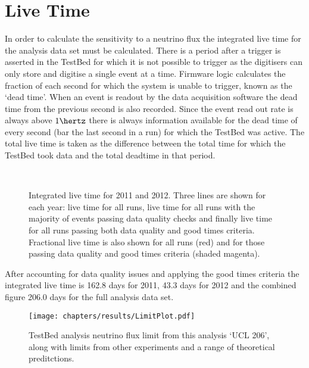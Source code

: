 \section{Live Time}
\label{sec:Live-Time}

In order to calculate the sensitivity to a neutrino flux the integrated live time for the analysis data set must be calculated. There is a period after a trigger is asserted in the TestBed for which it is not possible to trigger as the digitisers can only store and digitise a single event at a time. Firmware logic calculates the fraction of each second for which the system is unable to trigger, known as the `dead time'. When an event is readout by the data acquisition software the dead time from the previous second is also recorded. Since the event read out rate is always above $1 \hertz$ there is always information available for the dead time of every second (bar the last second in a run) for which the TestBed was active. The total live time is taken as the difference between the total time for which the TestBed took data and the total deadtime in that period.

\begin{figure}
  \hfill
  \\
  \hfill
  \caption{Integrated live time for 2011 and 2012. Three lines are shown for each year: live time for all runs, live time for all runs with the majority of events passing data quality checks and finally live time for all runs passing both data quality and good times criteria. Fractional live time is also shown for all runs (red) and for those passing data quality and good times criteria (shaded magenta).}
  \label{fig:Results:Integrated-LiveTime}
\end{figure}

After accounting for data quality issues and applying the good times criteria the integrated live time is 162.8 days for 2011, 43.3 days for 2012 and the combined figure 206.0 days for the full analysis data set.




\begin{figure}
  \texttt{[image: chapters/results/LimitPlot.pdf]}
  \caption{TestBed analysis neutrino flux limit from this analysis `UCL 206', along with limits from other experiments and a range of theoretical preditctions.}
  \label{fig:Results:Limit-Plot}
\end{figure}
